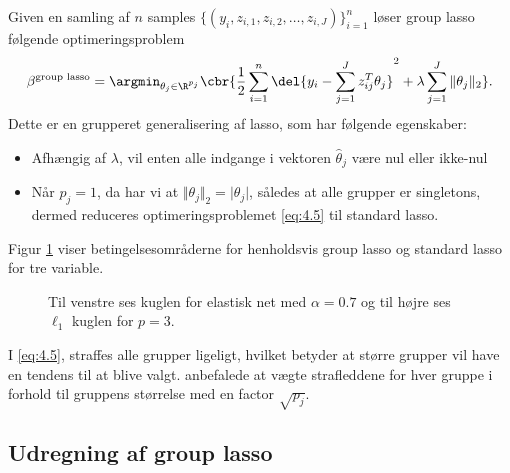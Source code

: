 Given en samling af $n$ samples \(\{(y_i, z_{i,1}, z_{i,2}, \ldots, z_{i,J})\}_{i=1}^n\) løser group lasso følgende optimeringsproblem
\begin{align}
\beta^{\text{group lasso}} = \argmin_{\theta_j \in \R^{p_j}} \cbr{\frac{1}{2} \sum_{i=1}^n \del{y_i - \sum_{j=1}^J z_{ij}^T \theta_j}^2 + \lambda \sum_{j=1}^J \Vert \theta_j \Vert_2}. \label{eq:4.5}
\end{align}
Dette er en grupperet generalisering af lasso, som har følgende egenskaber:
\begin{itemize}
\item Afhængig af $\lambda$, vil enten alle indgange i vektoren $\hat{\theta}_j$ være nul eller ikke-nul
\item Når $p_j=1$, da har vi at $\Vert \theta_j \Vert_2 = \vert \theta_j \vert$, således at alle grupper er singletons, dermed reduceres optimeringsproblemet \eqref{eq:4.5} til standard lasso.
\end{itemize}
Figur \ref{fig:elastisk_net} viser betingelsesområderne for henholdsvis group lasso og standard lasso for tre variable.
%
\begin{figure}[H]
\centering
\caption{Til venstre ses kuglen for elastisk net med \(\alpha=0.7\) og til højre ses \(\ell_1\) kuglen for \(p=3\).}
\label{fig:elastisk_net}
\end{figure}
%
I \eqref{eq:4.5}, straffes alle grupper ligeligt, hvilket betyder at større grupper vil have en tendens til at blive valgt.
\citep{group_lasso} anbefalede at vægte strafleddene for hver gruppe i forhold til gruppens størrelse med en factor \(\sqrt{p_j}\).

\subsection{Udregning af group lasso}
